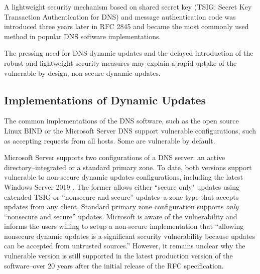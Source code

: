 A lightweight security mechanism based on shared secret key (TSIG: Secret Key Transaction Authentication for DNS) and message authentication code was introduced three years later in RFC 2845 \cite{rfc2845} and became the most commonly used method in popular DNS software implementations.
%

The pressing need for DNS dynamic updates and the delayed introduction of the robust and lightweight security measures may explain a rapid uptake of the vulnerable by design, non-secure dynamic updates.



\subsection{Implementations of Dynamic Updates}

The common implementations of the DNS software, such as the open source Linux BIND \cite{bind} or the Microsoft Server DNS support vulnerable configurations, such as accepting requests from all hosts.
Some are vulnerable by default.

Microsoft Server supports two configurations of a DNS server: an active directory--integrated or a standard primary zone.
To date, both versions support vulnerable to %
non-secure dynamic updates configurations, including the latest Windows Server 2019 \cite{step}.
The former allows either ``secure only" updates using extended TSIG or ``nonsecure and secure'' updates--a zone type that accepts updates from any client. %
Standard primary zone configuration supports \textit{only} ``nonsecure and secure''  updates.
Microsoft is aware of the vulnerability and informs the users willing to setup a non-secure implementation that ``allowing nonsecure dynamic updates is a significant security vulnerability because updates can be accepted from untrusted sources.''
However, it remains unclear why the vulnerable version is still supported in the latest production version of the software--over 20 years after the initial release of the RFC specification.

